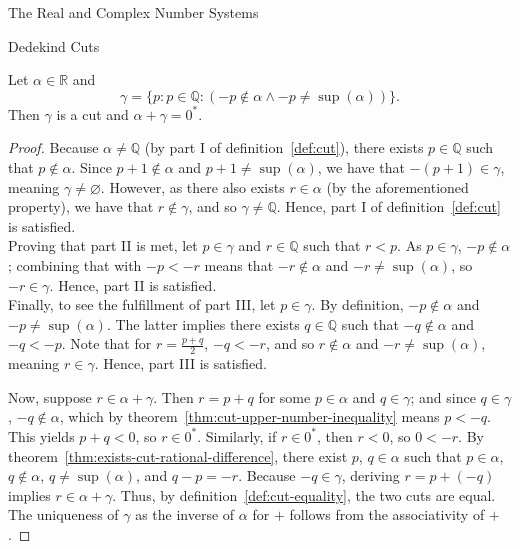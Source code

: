 \begin{chapter}{The Real and Complex Number Systems}
\begin{section}{Dedekind Cuts}
	\begin{theorem}
		\label{thm:cut-additive-inverse-exists}
		Let $\alpha \in \mathbb{R}$ and
		\[ \gamma = \{p : p \in \mathbb{Q} : (-p \nin \alpha \land -p \neq
			\sup(\alpha))\}. \] 
		Then $\gamma$ is a cut and $\alpha + \gamma = 0^*$.
	\end{theorem}

	\begin{proof}
		Because $\alpha \neq \mathbb{Q}$ (by part I of definition~\ref{def:cut}),
		there exists $p \in \mathbb{Q}$ such that $p \nin \alpha$. Since $p +
		1 \nin \alpha$ and $p + 1 \neq \sup(\alpha)$, we have that $-(p + 1)
		\in \gamma$, meaning $\gamma \neq \varnothing$. However, as there also
		exists $r \in \alpha$ (by the aforementioned property), we have that $r
		\nin \gamma$, and so $\gamma \neq \mathbb{Q}$. Hence, part I of
		definition~\ref{def:cut} is satisfied. \\

		Proving that part II is met, let $p \in \gamma$ and $r \in \mathbb{Q}$
		such that $r < p$. As $p \in \gamma$, $-p \nin \alpha$; combining
		that with $-p < -r$ means that $-r \nin \alpha$ and $-r \neq
		\sup(\alpha)$, so $-r \in \gamma$. Hence, part II is satisfied. \\

		Finally, to see the fulfillment of part III, let $p \in \gamma$. By
		definition, $-p \nin \alpha$ and $-p \neq \sup(\alpha)$. The latter
		implies there exists $q \in \mathbb{Q}$ such that $-q \nin \alpha$ and
		$-q < -p$. Note that for $r = \frac{p + q}{2}$, $-q < -r$, and so $
		r \nin \alpha$ and $-r \neq \sup(\alpha)$, meaning $r \in \gamma$.
		Hence, part III is satisfied. \\

		\newpage

		Now, suppose $r \in \alpha + \gamma$. Then $r = p + q$ for some $p \in 
		\alpha$ and $q \in \gamma$; and since $q \in \gamma$, $-q \nin
		\alpha$, which by theorem~\ref{thm:cut-upper-number-inequality} means $p
		< -q$. This yields $p + q < 0$, so $r \in 0^*$. Similarly, if $r \in
		0^*$, then $r < 0$, so $0 < -r$. By
		theorem~\ref{thm:exists-cut-rational-difference}, there exist $p$, $q \in
		\alpha$ such that $p \in \alpha$, $q \nin \alpha$, $q \neq
		\sup(\alpha)$, and $q - p = -r$.
		Because $-q \in \gamma$, deriving $r = p + (-q)$ implies $r \in \alpha
		+ \gamma$. Thus, by definition~\ref{def:cut-equality}, the two cuts are
		equal. \\

		The uniqueness of $\gamma$ as the inverse of $\alpha$ for $+$ follows 
		from the associativity of $+$.
	\end{proof}


\end{section}
\end{chapter}
